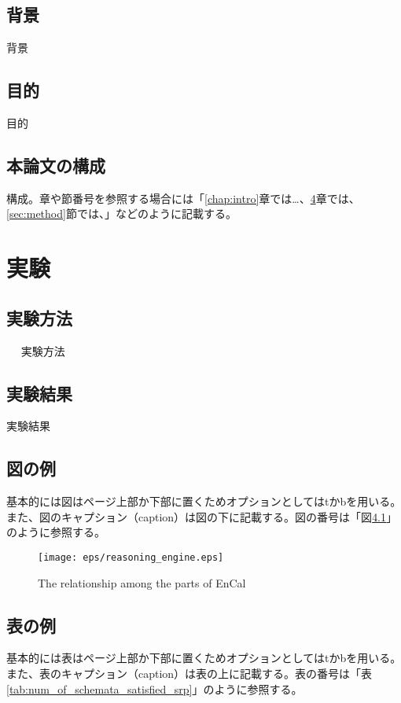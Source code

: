 \documentclass[12pt,epsf]{jreport}
\begin{document}
 \section{背景}
 背景


 \section{目的}
 目的


 \section{本論文の構成}
 構成。章や節番号を参照する場合には「\ref{chap:intro}章では…、\ref{chap:exp}章では、\ref{sec:method}節では、」などのように記載する。
 

\chapter{実験} \label{chap:exp}
 \section{実験方法}　\label{sec:method}
 実験方法

 \section{実験結果}
 実験結果

 
 \section{図の例}

 基本的には図はページ上部か下部に置くためオプションとしてはtかbを用いる。また、図のキャプション（caption）は図の下に記載する。図の番号は「図\ref{fig:reasoning_engine}」のように参照する。
 
 \begin{figure}[tb]
 \begin{center}
  \texttt{[image: eps/reasoning\_engine.eps]}
  \caption{The relationship among the parts of EnCal}
  \label{fig:reasoning_engine}
 \end{center}
\end{figure}

 \section{表の例}
 
 基本的には表はページ上部か下部に置くためオプションとしてはtかbを用いる。また、表のキャプション（caption）は表の上に記載する。表の番号は「表\ref{tab:num_of_schemata_satisfied_srp}」のように参照する。
\end{document}
